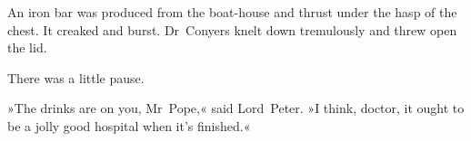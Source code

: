 An iron bar was produced from the boat-house and thrust under the hasp of the chest. It creaked and burst. Dr~Conyers knelt down tremulously and threw open the lid.

There was a little pause.

»The drinks are on you, Mr~Pope,« said Lord~Peter. »I think, doctor, it ought to be a jolly good hospital when it's finished.«